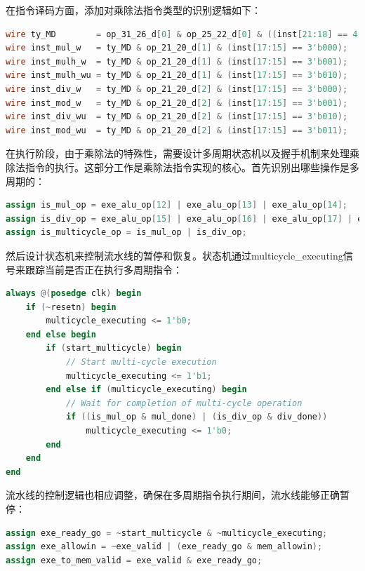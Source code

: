 \documentclass[11pt]{article}
\begin{document}
在指令译码方面，添加对乘除法指令类型的识别逻辑如下：

\begin{lstlisting}[language=verilog]
wire ty_MD        = op_31_26_d[0] & op_25_22_d[0] & ((inst[21:18] == 4'b0111) | (inst[21:18] == 4'b1000));
wire inst_mul_w   = ty_MD & op_21_20_d[1] & (inst[17:15] == 3'b000);
wire inst_mulh_w  = ty_MD & op_21_20_d[1] & (inst[17:15] == 3'b001);
wire inst_mulh_wu = ty_MD & op_21_20_d[1] & (inst[17:15] == 3'b010);
wire inst_div_w   = ty_MD & op_21_20_d[2] & (inst[17:15] == 3'b000);
wire inst_mod_w   = ty_MD & op_21_20_d[2] & (inst[17:15] == 3'b001);
wire inst_div_wu  = ty_MD & op_21_20_d[2] & (inst[17:15] == 3'b010);
wire inst_mod_wu  = ty_MD & op_21_20_d[2] & (inst[17:15] == 3'b011);
\end{lstlisting}

在执行阶段，由于乘除法的特殊性，需要设计多周期状态机以及握手机制来处理乘除法指令的执行。这部分工作是乘除法指令实现的核心。首先识别出哪些操作是多周期的：

\begin{lstlisting}[language=verilog]
assign is_mul_op = exe_alu_op[12] | exe_alu_op[13] | exe_alu_op[14];
assign is_div_op = exe_alu_op[15] | exe_alu_op[16] | exe_alu_op[17] | exe_alu_op[18];
assign is_multicycle_op = is_mul_op | is_div_op;
\end{lstlisting}

然后设计状态机来控制流水线的暂停和恢复。状态机通过multicycle\_executing信号来跟踪当前是否正在执行多周期指令：

\begin{lstlisting}[language=verilog]
always @(posedge clk) begin
    if (~resetn) begin
        multicycle_executing <= 1'b0;
    end else begin
        if (start_multicycle) begin
            // Start multi-cycle execution
            multicycle_executing <= 1'b1;
        end else if (multicycle_executing) begin
            // Wait for completion of multi-cycle operation
            if ((is_mul_op & mul_done) | (is_div_op & div_done))
                multicycle_executing <= 1'b0;
        end
    end
end
\end{lstlisting}

流水线的控制逻辑也相应调整，确保在多周期指令执行期间，流水线能够正确暂停：

\begin{lstlisting}[language=verilog]
assign exe_ready_go = ~start_multicycle & ~multicycle_executing;
assign exe_allowin = ~exe_valid | (exe_ready_go & mem_allowin);
assign exe_to_mem_valid = exe_valid & exe_ready_go;
\end{lstlisting}
\end{document}
